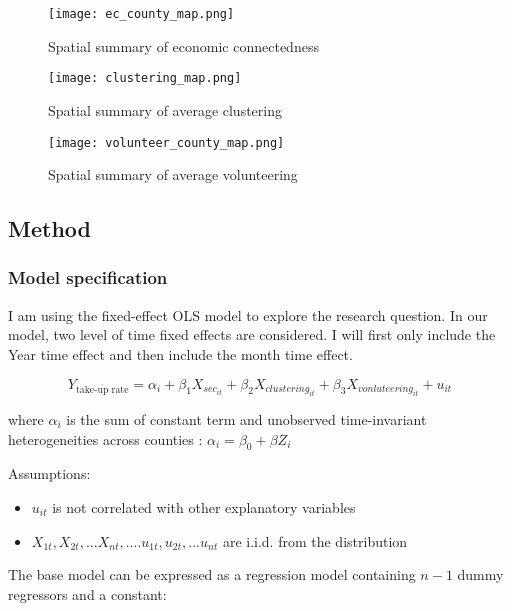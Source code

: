 \documentclass{article}
\begin{document}
\begin{figure}[ht]
    \centering
    \texttt{[image: ec\_county\_map.png]}
    \caption{Spatial summary of economic connectedness}
    \label{ec figure}
\end{figure}

\begin{figure}[ht]
    \centering
    \texttt{[image: clustering\_map.png]}
    \caption{Spatial summary of average clustering}
    \label{cluster figure}
\end{figure}

\begin{figure}[ht]
    \centering
    \texttt{[image: volunteer\_county\_map.png]}
    \caption{Spatial summary of average volunteering}
    \label{volun figure}
\end{figure}



\newpage



\subsection{Method}

\subsubsection{Model specification}

I am using the fixed-effect OLS model to explore the research question. In our model, two level of time fixed effects are considered. I will first only include the Year time effect and then include the month time effect.

$$Y_{\overline{\text{take-up rate}}}=\alpha_i+\beta_1 X_{sec_{it}}+\beta_2 X_{clustering_{it}}+\beta_3 X_{vonluteering_{it}}+u_{it}$$

where $\alpha_i$ is the sum of constant term and unobserved time-invariant heterogeneities across counties : $\alpha_i=\beta_0+\beta Z_i$

Assumptions:
\begin{itemize}
    \item  $u_{it}$ is not correlated with other explanatory variables
    \item $X_{1t}, X_{2t}, ... X_{nt}, ....u_{1t}, u_{2t}, ...u_{nt}$ are i.i.d. from the distribution
\end{itemize}

The base model can be expressed as a regression model containing $n-1$ dummy regressors and a constant:
\end{document}
